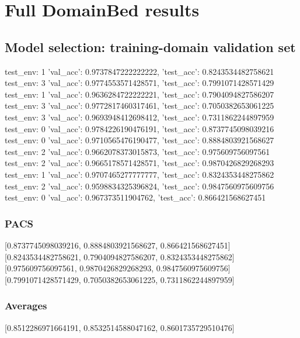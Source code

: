 \documentclass{article}
\begin{document}
\section{Full DomainBed results}

\subsection{Model selection: training-domain validation set}
test_env: 1
{'val_acc': 0.9737847222222222, 'test_acc': 0.8243534482758621}
test_env: 3
{'val_acc': 0.9774553571428571, 'test_acc': 0.7991071428571429}
test_env: 1
{'val_acc': 0.9636284722222221, 'test_acc': 0.7904094827586207}
test_env: 3
{'val_acc': 0.9772817460317461, 'test_acc': 0.7050382653061225}
test_env: 3
{'val_acc': 0.9693948412698412, 'test_acc': 0.7311862244897959}
test_env: 0
{'val_acc': 0.9784226190476191, 'test_acc': 0.8737745098039216}
test_env: 0
{'val_acc': 0.9710565476190477, 'test_acc': 0.8884803921568627}
test_env: 2
{'val_acc': 0.9662078373015873, 'test_acc': 0.975609756097561}
test_env: 2
{'val_acc': 0.9665178571428571, 'test_acc': 0.9870426829268293}
test_env: 1
{'val_acc': 0.9707465277777777, 'test_acc': 0.8324353448275862}
test_env: 2
{'val_acc': 0.9598834325396824, 'test_acc': 0.9847560975609756}
test_env: 0
{'val_acc': 0.967373511904762, 'test_acc': 0.866421568627451}

\subsubsection{PACS}
[0.8737745098039216, 0.8884803921568627, 0.866421568627451]
[0.8243534482758621, 0.7904094827586207, 0.8324353448275862]
[0.975609756097561, 0.9870426829268293, 0.9847560975609756]
[0.7991071428571429, 0.7050382653061225, 0.7311862244897959]

\begin{center}
\end{center}

\subsubsection{Averages}
[0.8512286971664191, 0.8532514588047162, 0.8601735729510476]

\begin{center}
\end{center}
\end{document}
